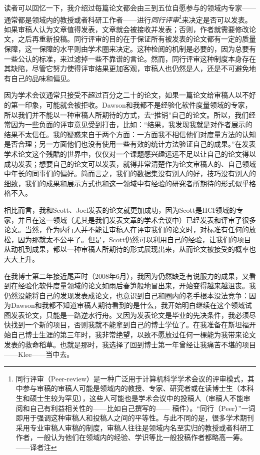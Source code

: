 \documentclass[12pt,UTF8,nofonts]{book}
\begin{document}
读者可以回忆一下，我介绍过每篇论文都会由三到五位自愿参与的领域内专家——通常都是领域内的教授或者科研工作者——进行\emph{同行评审}\footnote{同行评审（Peer-review）是一种广泛用于计算机科学学术会议的评审模式，其中参与审稿的审稿人可能是领域内的教授、专家、研究者或在读博士生（本科生和硕士生较为罕见），这些人可能也是学术会议中的投稿人（审稿人不能审阅和自己有利益相关性的——比如自己撰写的—— 稿件）。“同行（Peer）”一词即用于强调这种审稿人和投稿人之间的平等性。与此不同的是，很多学术期刊采用专业审稿人审稿的制度，审稿人往往是领域内名至实归的教授或者科研工作者，一般认为他们在领域内的经验、学识等比一般投稿作者都略高一筹。——译者注}来决定是否可以发表。如果审稿人认为文章值得发表，文章就会被接收并发表；否则，作者就需要修改论文，之后再重新投稿。同行评审的目的在于保证所有被发表的论文都有一定的质量保障，这一保障的水平则由学术圈来决定。这种检阅的机制是必要的，因为总要有一些公认的标准，来过滤掉一些不靠谱的言论。然而，同行评审这种制度本身存在其缺陷，尽管它努力使得评审结果更加客观，审稿人也仍然是人，还是不可避免地有自己的品味和偏见。

因为学术会议通常只接受不超过百分之二十的论文，如果一篇论文给审稿人以不好的第一印象，可能就会被拒收。Dawson和我都不是经验化软件度量领域的专家，所以我们并不能以一种审稿人所期待的方式，去“推销”自己的论文。所以，我们经常因为一些负面的评审意见受到打击，比如：“结果，我发现我就是对作者展示的结果不太信任。我的疑惑来自于两个方面：一方面我不相信他们对度量方法的认知是否合理；另一方面他们也没有使用一些有效的统计方法验证自己的成果。”在发表学术论文这个残酷的世界中，仅仅对一个课题感兴趣远远不足以让自己的论文得以成功发表；想要自己的论文可以发表，就得非常清楚作为论文审稿人的、自己领域中年长的同事们的偏好。简而言之，我们的数据集没有别人的好，技巧没有别人的细致，我们的成果和展示方式也和这一领域中有经验的研究者所期待的形式似乎格格不入。

相比而言，我和Scott、Joel发表的论文就更加成功，因为Scott是HCI领域的专家，并且在这一领域（尤其是我们发表文章的学术会议中）已经发表和评审了很多论文。当然，作为内行人并不能让审稿人在评审我们的论文时，对标准有任何的放松，因为那就太不公平了。但是，Scott仍然可以利用自己的经验，让我们的项目从动机到成果，都以一种审稿人所期待的形式展现出来，从而论文被接受的概率也大大上升。

\breakline

在我博士第二年接近尾声时（2008年6月），我因为仍然缺乏有说服力的成果，又看到在经验化软件度量领域的论文如雨后春笋般地冒出来，开始变得越来越沮丧。我仍然没能将自己的发现发表成论文，也意识到自己和圈内的老手根本没法竞争：因为Dawson和我都不知道审稿人期待看到的是什么，我开始明白继续在这个领域试图发表论文，只能是一路逆水行舟。又因为发表论文是毕业的先决条件，我必须尽快找到一个新的项目，否则我就不能拿到自己的博士学位了。在我准备在斯坦福开始自己博士生涯的第三年时，我非常绝望，以致不愿放过任何一棵能为我带来论文发表的救命稻草。也就是那时，我选择了回到博士第一年曾经让我痛苦不堪的项目——Klee——当中去。
\end{document}
